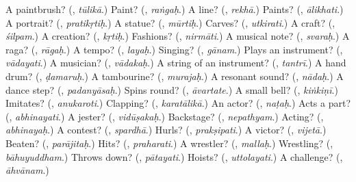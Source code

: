\begin{tcolorbox}[breakable,colback=teal!4,colframe=teal!35!black,title={Before you move on}]
A paintbrush? (\textbf{}, \emph{tūlikā}.) Paint? (\textbf{}, \emph{raṅgaḥ}.) A line? (\textbf{}, \emph{rekhā}.) Paints? (\textbf{}, \emph{ālikhati}.) A portrait? (\textbf{}, \emph{pratikṛtiḥ}.) A statue? (\textbf{}, \emph{mūrtiḥ}.) Carves? (\textbf{}, \emph{utkirati}.) A craft? (\textbf{}, \emph{śilpam}.) A creation? (\textbf{}, \emph{kṛtiḥ}.) Fashions? (\textbf{}, \emph{nirmāti}.) A musical note? (\textbf{}, \emph{svaraḥ}.) A raga? (\textbf{}, \emph{rāgaḥ}.) A tempo? (\textbf{}, \emph{layaḥ}.) Singing? (\textbf{}, \emph{gānam}.) Plays an instrument? (\textbf{}, \emph{vādayati}.) A musician? (\textbf{}, \emph{vādakaḥ}.) A string of an instrument? (\textbf{}, \emph{tantrī}.) A hand drum? (\textbf{}, \emph{ḍamaruḥ}.) A tambourine? (\textbf{}, \emph{murajaḥ}.) A resonant sound? (\textbf{}, \emph{nādaḥ}.) A dance step? (\textbf{}, \emph{padanyāsaḥ}.) Spins round? (\textbf{}, \emph{āvartate}.) A small bell? (\textbf{}, \emph{kiṅkiṇī}.) Imitates? (\textbf{}, \emph{anukaroti}.) Clapping? (\textbf{}, \emph{karatālikā}.) An actor? (\textbf{}, \emph{naṭaḥ}.) Acts a part? (\textbf{}, \emph{abhinayati}.) A jester? (\textbf{}, \emph{vidūṣakaḥ}.) Backstage? (\textbf{}, \emph{nepathyam}.) Acting? (\textbf{}, \emph{abhinayaḥ}.) A contest? (\textbf{}, \emph{spardhā}.) Hurls? (\textbf{}, \emph{prakṣipati}.) A victor? (\textbf{}, \emph{vijetā}.) Beaten? (\textbf{}, \emph{parājitaḥ}.) Hits? (\textbf{}, \emph{praharati}.) A wrestler? (\textbf{}, \emph{mallaḥ}.) Wrestling? (\textbf{}, \emph{bāhuyuddham}.) Throws down? (\textbf{}, \emph{pātayati}.) Hoists? (\textbf{}, \emph{uttolayati}.) A challenge? (\textbf{}, \emph{āhvānam}.)
\end{tcolorbox}

